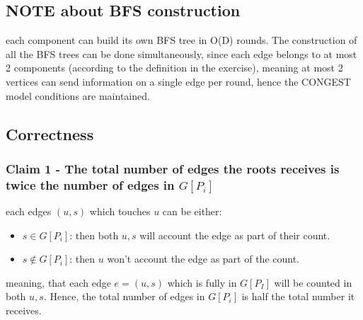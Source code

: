 \documentclass[11pt]{article}
\begin{document}
\begin{enumerate}
\begin{algorithmic}[1]
    \EndIf
    \EndIf
    
            \EndIf
        \EndIf
    \EndIf
\EndFor
\end{algorithmic}

\subsection*{NOTE about BFS construction}
each component can build its own BFS tree in O(D) rounds.
The construction of all the BFS trees can be done simultaneously, since each edge belongs to at most 2 components (according to the definition in the exercise), meaning at most 2 vertices can send information on a single edge per round, hence the CONGEST model conditions are maintained.

\subsection*{Correctness}
\subsubsection*{Claim 1 - The total number of edges the roots receives is twice the number of edges in $G[P_i]$}
each edges $(u,s)$ which touches $u$ can be either:
\begin{itemize}
    \item $s \in G[P_i]$: then both $u,s$ will account the edge as part of their count.
    \item $s \notin G[P_i]$: then $u$ won't account the edge as part of the count.
\end{itemize}
meaning, that each edge $e=(u,s)$ which is fully in $G[P_I]$ will be counted in both $u,s$.
Hence, the total number of edges in $G[P_i]$ is half the total number it receives.


\end{enumerate}
\end{document}
